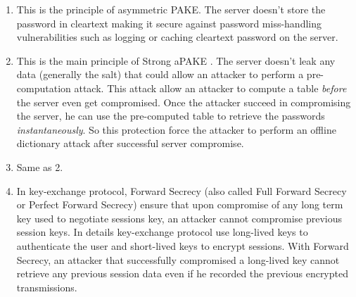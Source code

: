 \documentclass[../report.tex]{subfiles}
\begin{document}
\begin{enumerate}
 \item This is the principle of asymmetric PAKE. The server doesn't store the password in cleartext making it secure against password miss-handling vulnerabilities such as logging or caching cleartext password on the server.
 \item This is the main principle of Strong aPAKE \cite{OPAQUE_Paper}. The server doesn't leak any data (generally the salt) that could allow an attacker to perform a pre-computation attack. This attack allow an attacker to compute a table \emph{before} the server even get compromised. Once the attacker succeed in compromising the server, he can use the pre-computed table to retrieve the passwords \emph{instantaneously}. So this protection force the attacker to perform an offline dictionary attack after successful server compromise. %
 \item Same as 2.
 \item In key-exchange protocol, Forward Secrecy (also called Full Forward Secrecy or Perfect Forward Secrecy) ensure that upon compromise of any long term key used to negotiate sessions key, an attacker cannot compromise previous session keys.
 In details key-exchange protocol use long-lived keys to authenticate the user and short-lived keys to encrypt sessions. With Forward Secrecy, an attacker that successfully compromised a long-lived key cannot retrieve any previous session data even if he recorded the previous encrypted transmissions.
 

\end{enumerate}
\end{document}
